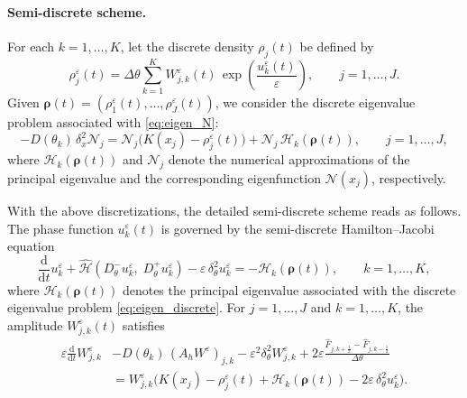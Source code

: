 \documentclass[11pt, dina4, amsfont12]{article}
\begin{document}
\paragraph{Semi-discrete scheme.}
For each $k=1,\dots,K$, let the discrete density $\rho_j(t)$ be defined by
\begin{equation} \label{eq:rho}
    \rho_j^\varepsilon(t)
=
\Delta\theta \sum_{k=1}^K
W_{j,k}^\varepsilon(t)\,
\exp\!\left(\frac{u_k^\varepsilon(t)}{\varepsilon}\right),
\qquad j=1,\dots,J.
\end{equation}
Given $\boldsymbol{\rho}(t) = (\rho_1^\varepsilon(t), \dots, \rho_J^\varepsilon(t))$, we consider the discrete eigenvalue problem associated
with \eqref{eq:eigen_N}:
\begin{equation}\label{eq:eigen_discrete}
    -D(\theta_k)\,\delta_x^2 \mathcal{N}_j
    = \mathcal{N}_j\bigl(K(x_j)-\rho_j^\varepsilon(t)\bigr)
    + \mathcal{N}_j\, \mathcal{H}_k(\boldsymbol{\rho}(t)),
    \qquad j = 1,\dots, J,
\end{equation}
where $\mathcal{H}_k(\boldsymbol{\rho}(t))$ and $\mathcal{N}_j$ denote the numerical
approximations of the principal eigenvalue and the corresponding eigenfunction
$\mathcal{N}(x_j)$, respectively.

With the above discretizations, the detailed semi-discrete scheme reads as
follows. The phase function $u_k^\varepsilon(t)$ is governed by the semi-discrete
Hamilton--Jacobi equation
\begin{equation}\label{eq:semi_discrete_u_detailed}
\frac{\mathrm d}{\mathrm dt} u_k^\varepsilon
+
\widehat{\mathcal H}
\!\left(D_\theta^- u_k^\varepsilon,\; D_\theta^+ u_k^\varepsilon\right)
- \varepsilon\, \delta_\theta^2 u_k^\varepsilon
= - \mathcal{H}_k(\boldsymbol{\rho}(t)),
\qquad k=1,\dots,K,
\end{equation}
where $\mathcal{H}_k(\boldsymbol{\rho}(t))$ denotes the principal eigenvalue associated
with the discrete eigenvalue problem \eqref{eq:eigen_discrete}.
For $j=1,\dots,J$ and $k=1,\dots,K$, the amplitude $W_{j,k}^\varepsilon(t)$
satisfies
\begin{equation}\label{eq:semi_discrete_W_detailed}
\begin{aligned}
\varepsilon \frac{\mathrm d}{\mathrm dt} W_{j,k}^\varepsilon
&- D(\theta_k)\,(A_h W^\varepsilon)_{j,k}
- \varepsilon^2 \delta_\theta^2 W^\varepsilon_{j,k}
+ 2 \varepsilon \frac{\widehat F_{j,k+\frac12}-\widehat F_{j,k-\frac12}}{\Delta\theta} \\
&= W_{j,k}^\varepsilon
\bigl(K(x_j)-\rho_j^\varepsilon(t)
+ \mathcal{H}_k(\boldsymbol{\rho}(t))
-2\varepsilon\,\delta_\theta^2 u_k^\varepsilon\bigr).
\end{aligned}
\end{equation}
\end{document}
